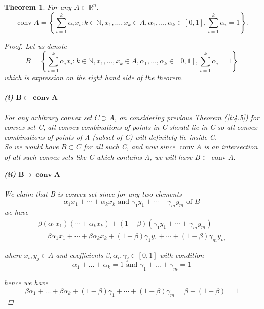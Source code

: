 \documentclass[oneside]{book}
\newtheorem{theorem}{Theorem}[section]
\begin{document}
	\begin{theorem}
		\label{t:5.8}
		For  any $A \subset \mathbb{R}^n.$
		$$ \operatorname{conv} A=\left\{\sum_{i=1}^{k} \alpha_{i} x_{i}: k \in \mathbb{N}, x_{1}, \ldots, x_{k} \in A, \alpha_{1}, \ldots, \alpha_{k} \in[0,1], \sum_{i=1}^{k} \alpha_{i}=1\right\}. $$
		
		\begin{proof}
			Let us denote $$ B = \left\{\sum_{i=1}^{k} \alpha_{i} x_{i}: k \in \mathbb{N}, x_{1}, \ldots, x_{k} \in A, \alpha_{1}, \ldots, \alpha_{k} \in[0,1], \sum_{i=1}^{k} \alpha_{i}=1\right\} $$  which is expression on the right hand side of the theorem.\\\\
			\textbf{(i)}  $ \mathbf{B} \subset \mathbf{\operatorname{conv} A}  $\\\\
			For any arbitrary convex set $C \supset A$, on considering previous Theorem (\ref{t:4.5}) for convex set C, all convex combinations of points in C should lie in C so all convex combinations of points of A (subset of  C) will definitely lie inside C. \\ 
			So we would have $B\subset C $ for all such C, and now since  $\operatorname{conv} A $ is an intersection of all such convex sets like C  which contains A, we will have  $ B \subset \operatorname{conv} A.  $  
			
			\textbf{(ii)}  $ \mathbf{B} \supset \mathbf{\operatorname{conv} A}  $\\\\
			We claim that B is convex set since for any two elements
			\newpage
			$$\alpha_{1} x_{1}+\cdots+\alpha_{k} x_{k} \text{ and }  \gamma_{1} y_{1}+\cdots+\gamma_{m} y_{m}  \text{ of } B $$ 
			we have                 
			\begin{multline}
			\beta\left(\alpha_{1} x_{1}\right)  \left(\cdots+\alpha_{k} x_{k} \right) +(1-\beta)\left(\gamma_{1} y_{1}+\cdots+\gamma_{m} y_{m}\right) \\ = \beta \alpha_{1} x_{1}+\cdots+\beta \alpha_{k} x_{k}+(1-\beta) \gamma_{1} y_{1}+\cdots+(1-\beta) \gamma_{m} y_{m}  
			\end{multline}
			
			where  $x_{i}, y_{j} \in A$ and coefficients $\beta, \alpha_{i}, \gamma_{j} \in[0,1]$ with  condition $$\alpha_{1}+\ldots+\alpha_{k}=1 \text{ and } \gamma_{1}+\ldots+\gamma_{m}=1$$ 
			
			hence we have \\
			$$
			\beta \alpha_{1}+\ldots+\beta \alpha_{k}+(1-\beta) \gamma_{1}+\cdots+(1-\beta) \gamma_{m}=\beta+(1-\beta)=1
			$$
			

\end{proof}
\end{theorem}
\end{document}
